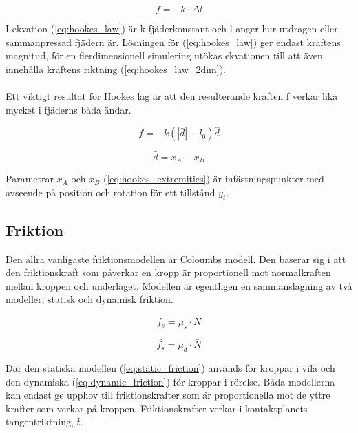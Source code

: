 \documentclass[a4paper,12pt,twopage,swedish]{article}
\begin{document}
\begin{equation}\label{eq:hookes_law}
f = - k \cdot \Delta l
\end{equation}

I ekvation (\ref{eq:hookes_law}) är k  fjäderkonstant och l anger hur utdragen eller sammanpressad fjädern är. Lösningen för (\ref{eq:hookes_law}) ger endast  kraftens magnitud, för en flerdimensionell simulering utökas ekvationen till att även innehålla kraftens riktning (\ref{eq:hookes_law_2dim}).
\\
\\Ett viktigt resultat för Hookes lag är att den resulterande kraften f verkar lika mycket i fjäderns båda ändar.

\begin{equation}\label{eq:hookes_law_2dim}
f = - k (|\bar{d}| - l_0)\hat{d}
\end{equation}

\begin{equation}\label{eq:hookes_extremities}
\bar{d} = x_A - x_B
\end{equation}

Parametrar $x_A$ och $x_B$ (\ref{eq:hookes_extremities}) är infästningspunkter med avseende på position och rotation för ett tillstånd $y_t$.


\subsection{Friktion}

Den allra vanligaste friktionsmodellen är Coloumbs modell. Den baserar sig i att den friktionskraft som påverkar en kropp är proportionell mot normalkraften mellan kroppen och underlaget. Modellen är egentligen en sammanslagning av två modeller, statisk och dynamisk friktion.

\begin{equation}\label{eq:static_friction}
\bar{f_s} = \mu_s \cdot \bar{N}
\end{equation}

\begin{equation}\label{eq:dynamic_friction}
\bar{f_s} = \mu_d \cdot \bar{N}
\end{equation}

Där den statiska modellen (\ref{eq:static_friction}) används för kroppar i vila och den dynamiska (\ref{eq:dynamic_friction}) för kroppar i rörelse. Båda modellerna kan endast ge upphov till friktionskrafter som är proportionella mot de yttre krafter som verkar på kroppen. Friktionskrafter verkar i kontaktplanets tangentriktning, $\bar{t}$.
\end{document}
